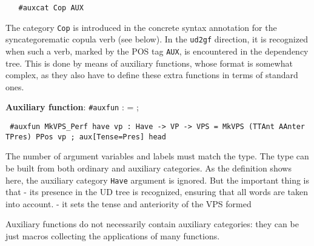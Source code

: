 \begin{verbatim}
   #auxcat Cop AUX
\end{verbatim}

The category \texttt{Cop} is introduced in the concrete syntax
annotation for the syncategorematic copula verb (see below). In the
\texttt{ud2gf} direction, it is recognized when such a verb, marked by
the POS tag \texttt{AUX}, is encountered in the dependency tree. This is
done by means of auxiliary functions, whose format is somewhat complex,
as they also have to define these extra functions in terms of standard
ones.

\textbf{Auxiliary function}: \texttt{\#auxfun} : = ;

\begin{verbatim}
 #auxfun MkVPS_Perf have vp : Have -> VP -> VPS = MkVPS (TTAnt AAnter TPres) PPos vp ; aux[Tense=Pres] head
\end{verbatim}

The number of argument variables and labels must match the type. The
type can be built from both ordinary and auxiliary categories. As the
definition shows here, the auxiliary category \texttt{Have} argument is
ignored. But the important thing is that - its presence in the UD tree
is recognized, ensuring that all words are taken into account. - it sets
the tense and anteriority of the VPS formed

Auxiliary functions do not necessarily contain auxiliary categories:
they can be just macros collecting the applications of many functions.

